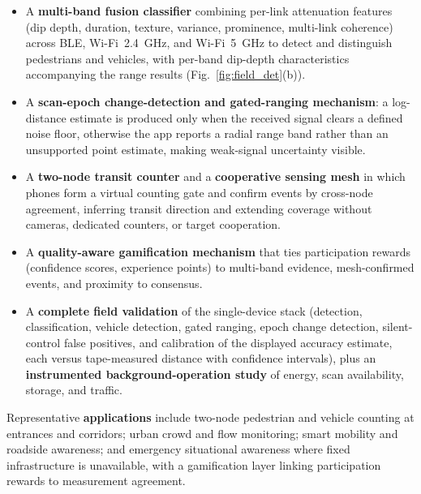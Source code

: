 \documentclass[journal,10pt]{IEEEtran}
\begin{document}
\begin{itemize}
\item A \textbf{multi-band fusion classifier} combining per-link attenuation
features (dip depth, duration, texture, variance, prominence, multi-link
coherence) across BLE, Wi-Fi~2.4~GHz, and Wi-Fi~5~GHz to detect and
distinguish pedestrians and vehicles, with per-band dip-depth
characteristics accompanying the range results (Fig.~\ref{fig:field_det}(b)).

\item A \textbf{scan-epoch change-detection and gated-ranging mechanism}: a
log-distance estimate is produced only when the received signal clears a
defined noise floor, otherwise the app reports a radial range band rather
than an unsupported point estimate, making weak-signal uncertainty visible.

\item A \textbf{two-node transit counter} and a \textbf{cooperative sensing
mesh} in which phones form a virtual counting gate and confirm events by
cross-node agreement, inferring transit direction and extending coverage
without cameras, dedicated counters, or target cooperation.

\item A \textbf{quality-aware gamification mechanism} that ties
participation rewards (confidence scores, experience points) to multi-band
evidence, mesh-confirmed events, and proximity to consensus.

\item A \textbf{complete field validation} of the single-device stack
(detection, classification, vehicle detection, gated ranging, epoch change
detection, silent-control false positives, and calibration of the displayed
accuracy estimate, each versus tape-measured distance with confidence
intervals), plus an \textbf{instrumented background-operation study} of
energy, scan availability, storage, and traffic.
\end{itemize}

Representative \textbf{applications} include two-node pedestrian and vehicle
counting at entrances and corridors; urban crowd and flow monitoring; smart
mobility and roadside awareness; and emergency situational awareness where
fixed infrastructure is unavailable, with a gamification layer linking
participation rewards to measurement agreement.
\end{document}
